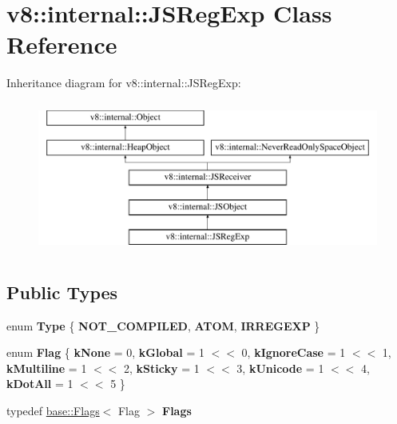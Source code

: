 \hypertarget{classv8_1_1internal_1_1JSRegExp}{}\section{v8\+:\+:internal\+:\+:J\+S\+Reg\+Exp Class Reference}
\label{classv8_1_1internal_1_1JSRegExp}
Inheritance diagram for v8\+:\+:internal\+:\+:J\+S\+Reg\+Exp\+:\begin{figure}[H]
\begin{center}
\leavevmode
\includegraphics[height=5.000000cm]{classv8_1_1internal_1_1JSRegExp}
\end{center}
\end{figure}
\subsection*{Public Types}
\begin{DoxyCompactItemize}
\item 
\mbox{\label{classv8_1_1internal_1_1JSRegExp_a4f505066a55b1fa40937655595e04152}} 
enum {\bfseries Type} \{ {\bfseries N\+O\+T\+\_\+\+C\+O\+M\+P\+I\+L\+ED}, 
{\bfseries A\+T\+OM}, 
{\bfseries I\+R\+R\+E\+G\+E\+XP}
 \}
\item 
\mbox{\label{classv8_1_1internal_1_1JSRegExp_a3fe304d5d9269091f2a4f33eee1af177}} 
enum {\bfseries Flag} \{ \newline
{\bfseries k\+None} = 0, 
{\bfseries k\+Global} = 1 $<$$<$ 0, 
{\bfseries k\+Ignore\+Case} = 1 $<$$<$ 1, 
{\bfseries k\+Multiline} = 1 $<$$<$ 2, 
\newline
{\bfseries k\+Sticky} = 1 $<$$<$ 3, 
{\bfseries k\+Unicode} = 1 $<$$<$ 4, 
{\bfseries k\+Dot\+All} = 1 $<$$<$ 5
 \}
\item 
\mbox{\label{classv8_1_1internal_1_1JSRegExp_a2502565faa9ee5c3861105fd7e1915e2}} 
typedef \mbox{\hyperlink{classv8_1_1base_1_1Flags}{base\+::\+Flags}}$<$ Flag $>$ {\bfseries Flags}
\end{DoxyCompactItemize}
